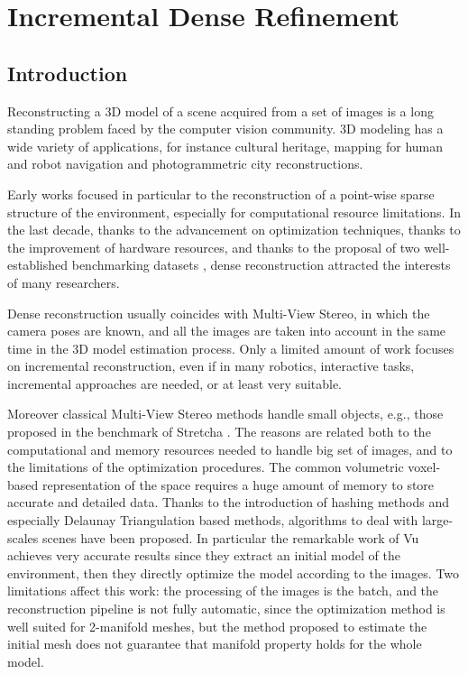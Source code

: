 \chapter{Incremental Dense Refinement}



\section{Introduction}
Reconstructing a 3D model of a scene acquired from a set of images is a long standing problem faced by the computer vision community. 
3D modeling has a wide variety of applications, for instance cultural heritage, mapping for human and robot navigation and photogrammetric city reconstructions.


Early works focused in particular to the reconstruction of a point-wise sparse structure of the environment, especially for computational resource limitations.
In the last decade, thanks to the advancement on optimization techniques,  thanks to the improvement of hardware resources, and thanks to the proposal of two well-established benchmarking datasets \cite{seitz_et_al06,strecha2008},  dense reconstruction attracted the interests of many researchers.

Dense reconstruction usually coincides with Multi-View Stereo, in which the camera poses are known, and all the images are taken into account in the same time in the 3D model estimation process.
Only a limited amount of work focuses on incremental reconstruction, even if in many robotics, interactive tasks, incremental approaches are needed, or at least very suitable.

Moreover classical Multi-View Stereo methods \cite{gargallo2005bayesian,delaunoy_et_al_08} handle small objects, e.g., those proposed in the benchmark of Stretcha \etal \cite{strecha2006combined}.
The reasons are related both to the computational and memory resources needed to handle big set of images, and to the limitations of the optimization procedures.
The common volumetric voxel-based representation of the space requires a huge amount of memory to store accurate and detailed data.
Thanks to the introduction of hashing methods and especially  Delaunay Triangulation based methods, algorithms to deal with large-scales scenes have been proposed.
In particular the remarkable work of Vu \etal \cite{vu_et_al_2012} achieves very accurate results since they extract an initial model of the environment, then they directly optimize the model according to the images. 
Two limitations affect this work: the processing of the images is the batch, and the reconstruction pipeline is not fully automatic, since the optimization method is well suited for 2-manifold meshes, but the method proposed to estimate the initial mesh does not guarantee that manifold property holds for the whole model.


